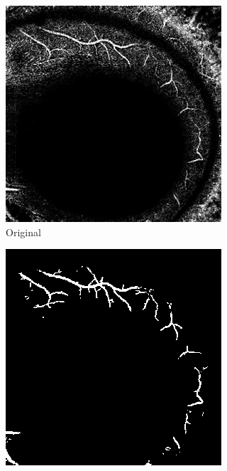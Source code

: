 \begin{figure}[H]
\begin{minipage}{.3\textwidth}
\begin{subfigure}{\textwidth}
\includegraphics[width=\textwidth]{Pictures/nnUnet/Praxis/Task108-Retina3D/vis/orig_008_0000-66.png}
\caption{Original}
\end{subfigure}
\end{minipage}
\begin{minipage}{.3\textwidth}
\begin{subfigure}{\textwidth}
\includegraphics[width=\textwidth]{Pictures/nnUnet/Praxis/Task108-Retina3D/vis/gt_008-66.png}

\end{subfigure}
\end{minipage}
\end{figure}
